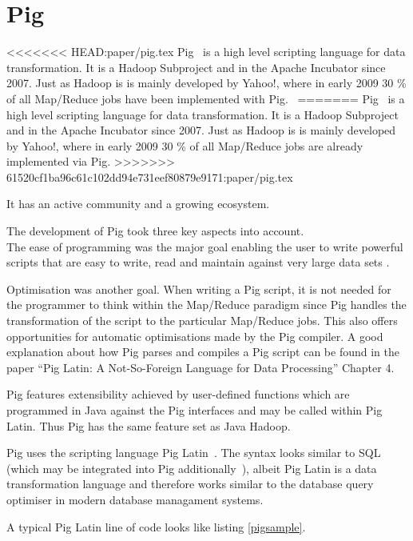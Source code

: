\section{Pig}

<<<<<<< HEAD:paper/pig.tex
Pig~\cite{pigWebsite}  is a high level scripting language for data transformation. It is a Hadoop Subproject and in the Apache Incubator since 2007. Just as Hadoop is is mainly developed by Yahoo!, where in early 2009 30 \% of all Map/Reduce jobs have been implemented with Pig.~\cite{pig30percent}
=======
Pig~\cite{pigWebsite}  is a high level scripting language for data transformation. It is a Hadoop Subproject and in the Apache Incubator since 2007. Just as Hadoop is is mainly developed by Yahoo!, where in early 2009 30 \% of all Map/Reduce jobs are already implemented via Pig.%
>>>>>>> 61520cf1ba96c61c102dd94e731eef80879e9171:paper/pig.tex

It has an active community and a growing ecosystem.

The development of Pig took three key aspects into account. \\
The ease of programming was the major goal enabling the user to write powerful scripts that are easy to write, read and maintain against very large data sets .~\cite{pigWebsite}

Optimisation was another goal. When writing a Pig script, it is not needed for the programmer to think within the Map/Reduce paradigm since Pig handles the transformation of the script to the particular Map/Reduce jobs. This also offers opportunities for automatic optimisations made by the Pig compiler. A good explanation about how Pig parses and compiles a Pig script can be found in the paper ``Pig Latin: A Not-So-Foreign Language for Data Processing'' Chapter 4.~\cite{pigNotForeign}

Pig features extensibility achieved by user-defined functions which are programmed in Java against the Pig interfaces and may be called within Pig Latin. Thus Pig has the same feature set as Java Hadoop.

Pig uses the scripting language Pig Latin~\cite{pigManual}. The syntax looks similar to SQL (which may be integrated into Pig additionally~\cite{pigSql}), albeit Pig Latin is a data transformation language and therefore works similar to the database query optimiser in modern database managament systems.

A typical Pig Latin line of code looks like listing \ref{pigsample}.

